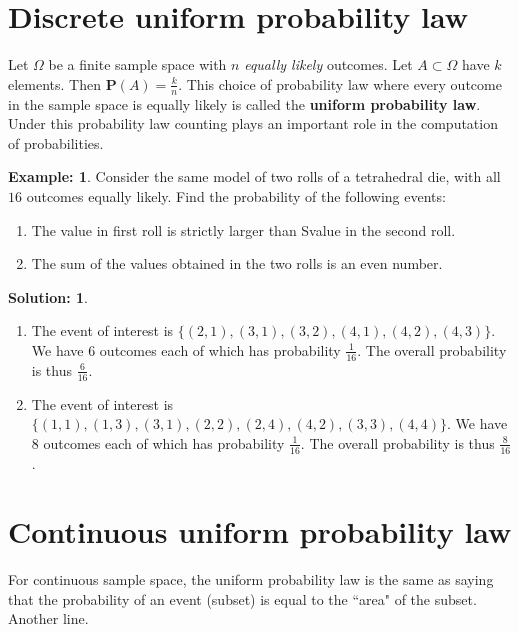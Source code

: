 \documentclass[11pt]{amsart}
\theoremstyle{definition} \newtheorem{thm}{Theorem:} \theoremstyle{plain}
\theoremstyle{definition} \newtheorem*{nnthm}{Theorem:} \theoremstyle{plain}
\theoremstyle{definition} \newtheorem{lem}{Lemma} \theoremstyle{plain}
\theoremstyle{definition} \newtheorem*{nnlem}{Lemma:} \theoremstyle{plain}
\theoremstyle{definition} \newtheorem{prf}{Proof:} \theoremstyle{plain}
\theoremstyle{definition} \newtheorem*{nnprf}{Proof:} \theoremstyle{plain}
\theoremstyle{definition} \newtheorem{eg}{Example:} \theoremstyle{plain}
\theoremstyle{definition} \newtheorem*{sol}{Solution:} \theoremstyle{plain}
\newcommand{\prob}[1]{\mathbf{P}(#1)}
\begin{document}
\section{Discrete uniform probability law}
Let $\Omega$ be a finite sample space with $n$ \emph{equally likely} outcomes. 
Let $A \subset \Omega$ have $k$ elements. Then $\prob{A} = \frac{k}{n}$. This 
choice of probability law where every outcome in the sample space is equally 
likely is called the \textbf{uniform probability law}. Under this probability 
law counting plays an important role in the computation of probabilities.
 
\begin{eg}
Consider the same model of two rolls of a tetrahedral die, with all $16$ 
outcomes equally likely. Find the probability of the following events:
\begin{enumerate}
\item
The value in first roll is strictly larger than Svalue in the second roll.
\item
The sum of the values obtained in the two rolls is an even number.
\end{enumerate}
\end{eg}
\begin{sol}
\hfill
\begin{enumerate}
\item
The event of interest is $\{ (2, 1), (3, 1), (3, 2), (4, 1), (4, 2), (4, 3) \}$. 
We have $6$ outcomes each of which has probability $\frac{1}{16}$. The overall probability is thus $\frac{6}{16}$.
\item
The event of interest is $\{ (1, 1), (1, 3), (3, 1), (2, 2), (2, 4), (4, 2), 
(3, 3), (4, 4) \}$. We have $8$ outcomes each of which has probability 
$\frac{1}{16}$. The overall probability is thus $\frac{8}{16}$.
\end{enumerate}
\end{sol}


\section{Continuous uniform probability law}
For continuous sample space, the uniform probability law is the same as saying 
that the probability of an event (subset) is equal to the ``area" of the subset.
Another line.
\end{document}
